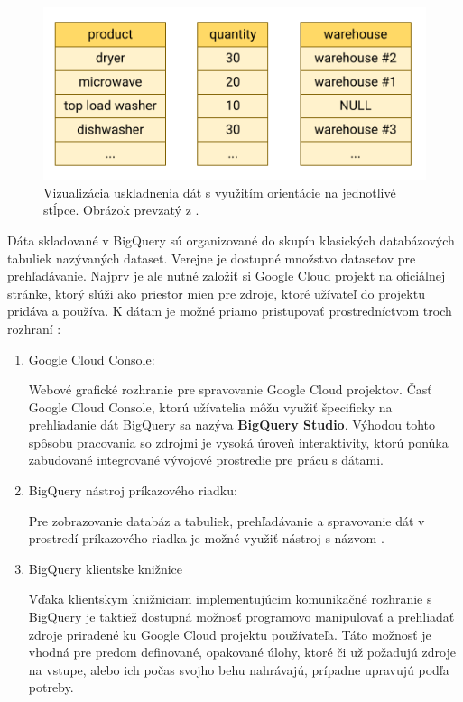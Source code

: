 \begin{figure}[htb]
\begin{center}
 \includegraphics[scale=0.7]{obrazky-figures/column-oriented-store.png}
 \caption{Vizualizácia uskladnenia dát s využitím orientácie na jednotlivé stĺpce. Obrázok prevzatý z \cite{google-bq-storage}.}
 \label{img:column-oriented-store}
\end{center}
\end{figure}

\pagebreak

Dáta skladované v BigQuery sú organizované do skupín klasických databázových tabuliek nazývaných dataset.
Verejne je dostupné množstvo datasetov pre prehľadávanie.
Najprv je ale nutné založiť si Google Cloud projekt na oficiálnej stránke, ktorý slúži ako priestor mien pre zdroje, ktoré užívateľ do projektu pridáva a používa.
K dátam je možné priamo pristupovať prostredníctvom troch rozhraní \cite{google-bq}:
\begin{enumerate}
    \item Google Cloud Console:

    Webové grafické rozhranie pre spravovanie Google Cloud projektov. 
    Časť Google Cloud Console, ktorú užívatelia môžu využiť špecificky na prehliadanie dát BigQuery sa nazýva \textbf{BigQuery Studio}.
    Výhodou tohto spôsobu pracovania so zdrojmi je vysoká úroveň interaktivity, ktorú ponúka zabudované integrované vývojové prostredie pre prácu s dátami. 

    \item BigQuery nástroj príkazového riadku:

    Pre zobrazovanie databáz a tabuliek, prehľadávanie a spravovanie dát v prostredí príkazového riadka je možné využiť nástroj s názvom . 
    
    \item BigQuery klientske knižnice

    Vďaka klientskym knižniciam implementujúcim komunikačné rozhranie s BigQuery je taktiež dostupná možnosť programovo manipulovať a prehliadať zdroje priradené ku Google Cloud projektu používateľa.
    Táto možnosť je vhodná pre predom definované, opakované úlohy, ktoré či už požadujú zdroje na vstupe, alebo ich počas svojho behu nahrávajú, prípadne upravujú podľa potreby.
\end{enumerate}


